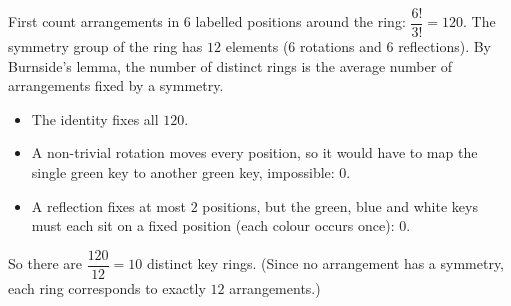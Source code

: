 First count arrangements in $6$ labelled positions around the ring: $\dfrac{6!}{3!}=120$. The symmetry group of the ring has $12$ elements ($6$ rotations and $6$ reflections). By Burnside's lemma, the number of distinct rings is the average number of arrangements fixed by a symmetry.
\begin{itemize}
\item The identity fixes all $120$.
\item A non-trivial rotation moves every position, so it would have to map the single green key to another green key, impossible: $0$.
\item A reflection fixes at most $2$ positions, but the green, blue and white keys must each sit on a fixed position (each colour occurs once): $0$.
\end{itemize}
So there are $\dfrac{120}{12}=\boxed{10}$ distinct key rings. (Since no arrangement has a symmetry, each ring corresponds to exactly $12$ arrangements.)
